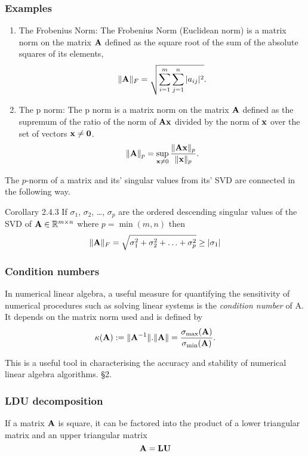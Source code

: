 \documentclass{amsart}[12pt]
\begin{document}
\subsubsection{Examples}

\begin{enumerate}
\item{The Frobenius Norm:}
The Frobenius Norm (Euclidean norm) is a matrix norm on the matrix ${\bf A}$ defined as the square root of the sum
of the absolute squares of its elements,
\[
	\|{\bf A}\|_F = \sqrt{\sum_{i=1}^m \sum_{j=1}^n |a_{ij}|^2}.
\]

\item{The p norm:}
The p norm is a matrix norm on the matrix ${\bf A}$ defined as the supremum of the ratio of the norm of
${\bf A} {\bf x}$ divided by the norm of ${\bf x}$ over the set of vectors ${\bf x} \ne {\bf0}$.
\[
	\|{\bf A}\|_p = \sup_{{\bf x} \ne 0} \frac{\|{\bf A} {\bf x}\|_p}{\|{\bf x}\|_p}.
\]
\end{enumerate}

The $p$-norm of a matrix and its' singular values from its' SVD are connected in the following way.

\cite{Golub:1996:MC:248979} Corollary 2.4.3 %
If $\sigma_1$, $\sigma_2$, \ldots, $\sigma_p$ are the ordered descending singular values of the SVD of ${\bf A}
\in {\mathbb{R}}^{m \times n}$ where $p = \min{(m, n)}$ then
\[
\|{\bf A}\|_F = \sqrt{\sigma_1^2 + \sigma_2^2 + \ldots + \sigma_p^2} \geq |\sigma_1|
\]

\subsubsection{Condition numbers}
In numerical linear algebra, a useful measure for quantifying the sensitivity of numerical procedures such as
solving linear systems is the \emph{condition number} of A. It depends on the matrix norm used and is defined by
\[
	\kappa({\bf A}) := \|{\bf A}^{-1}\|.\|{\bf A}\| = \frac{\sigma_{\text{max}}({\bf A})}{\sigma_{\text{min}}({\bf A})}.
\]

This is a useful tool in characterising the accuracy and stability of numerical linear algebra algorithms.
\cite{Golub:1996:MC:248979} \S 2.

\subsubsection{LDU decomposition}

If a matrix ${\bf A}$ is square, it can be factored into the product of a lower triangular matrix and an upper 
triangular matrix
\[
	{\bf A} = {\bf L} {\bf U}
\]
\end{document}
